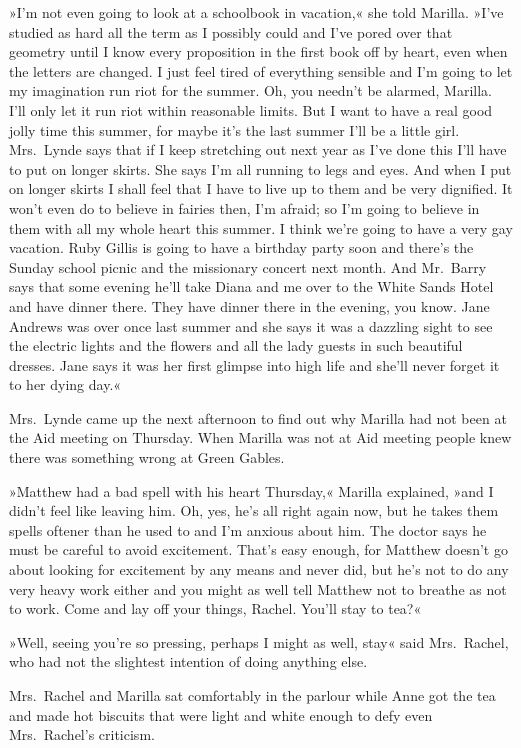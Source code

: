 »I'm not even going to look at a schoolbook in vacation,« she told Marilla. »I've studied as hard all the term as I possibly could and I've pored over that geometry until I know every proposition in the first book off by heart, even when the letters are changed. I just feel tired of everything sensible and I'm going to let my imagination run riot for the summer. Oh, you needn't be alarmed, Marilla. I'll only let it run riot within reasonable limits. But I want to have a real good jolly time this summer, for maybe it's the last summer I'll be a little girl. Mrs.~Lynde says that if I keep stretching out next year as I've done this I'll have to put on longer skirts. She says I'm all running to legs and eyes. And when I put on longer skirts I shall feel that I have to live up to them and be very dignified. It won't even do to believe in fairies then, I'm afraid; so I'm going to believe in them with all my whole heart this summer. I think we're going to have a very gay vacation. Ruby Gillis is going to have a birthday party soon and there's the Sunday school picnic and the missionary concert next month. And Mr.~Barry says that some evening he'll take Diana and me over to the White Sands Hotel and have dinner there. They have dinner there in the evening, you know. Jane Andrews was over once last summer and she says it was a dazzling sight to see the electric lights and the flowers and all the lady guests in such beautiful dresses. Jane says it was her first glimpse into high life and she'll never forget it to her dying day.«

Mrs.~Lynde came up the next afternoon to find out why Marilla had not been at the Aid meeting on Thursday. When Marilla was not at Aid meeting people knew there was something wrong at Green Gables.

»Matthew had a bad spell with his heart Thursday,« Marilla explained, »and I didn't feel like leaving him. Oh, yes, he's all right again now, but he takes them spells oftener than he used to and I'm anxious about him. The doctor says he must be careful to avoid excitement. That's easy enough, for Matthew doesn't go about looking for excitement by any means and never did, but he's not to do any very heavy work either and you might as well tell Matthew not to breathe as not to work. Come and lay off your things, Rachel. You'll stay to tea?«

»Well, seeing you're so pressing, perhaps I might as well, stay« said Mrs.~Rachel, who had not the slightest intention of doing anything else.

Mrs.~Rachel and Marilla sat comfortably in the parlour while Anne got the tea and made hot biscuits that were light and white enough to defy even Mrs.~Rachel's criticism.

